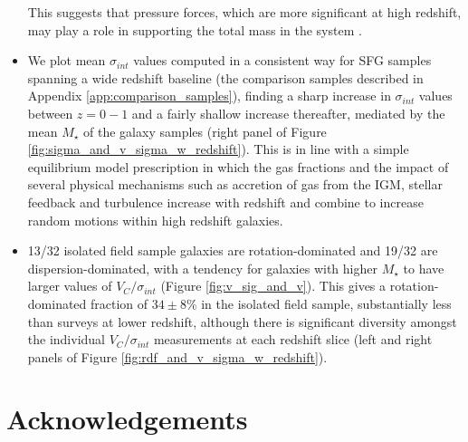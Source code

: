 \documentclass[fleqn,usenatbib]{mn2e}
\begin{document}
\begin{itemize}
    This suggests that pressure forces, which are more significant at high redshift, may play a role in supporting the total mass in the system \citep[e.g.][]{Burkert2010}.  
    \item We plot mean $\sigma_{int}$ values computed in a consistent way for SFG samples spanning a wide redshift baseline (the comparison samples described in Appendix \ref{app:comparison_samples}), finding a sharp increase in $\sigma_{int}$ values between $z=0-1$ and a fairly shallow increase thereafter, mediated by the mean $M_{\star}$ of the galaxy samples (right panel of Figure \ref{fig:sigma_and_v_sigma_w_redshift}).
    This is in line with a simple equilibrium model prescription in which the gas fractions and the impact of several physical mechanisms such as accretion of gas from the IGM, stellar feedback and turbulence increase with redshift and combine to increase random motions within high redshift galaxies.
    \item 13/32 isolated field sample galaxies are rotation-dominated and 19/32 are dispersion-dominated, with a tendency for galaxies with higher $M_{\star}$ to have larger values of $V_{C}/\sigma_{int}$ (Figure \ref{fig:v_sig_and_v}).
    This gives a rotation-dominated fraction of $34 \pm 8 \%$ in the isolated field sample, substantially less than surveys at lower redshift, although there is significant diversity amongst the individual $V_{C}/\sigma_{int}$ measurements at each redshift slice (left and right panels of Figure \ref{fig:rdf_and_v_sigma_w_redshift}).

\end{itemize}

\section*{Acknowledgements}
\end{document}

